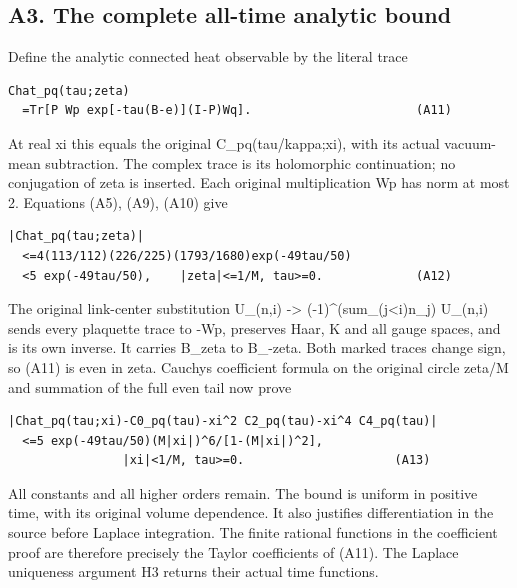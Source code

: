 \documentclass[11pt,a4paper]{article}
\renewcommand{\[}{\begingroup\small\originaldisplaystart}
\renewcommand{\]}{\originaldisplayend\endgroup}
\begin{document}
\subsection{A3. The complete all-time analytic
bound}\label{a3.-the-complete-all-time-analytic-bound}

Define the analytic connected heat observable by the literal trace

\begin{verbatim}
Chat_pq(tau;zeta)
  =Tr[P Wp exp[-tau(B-e)](I-P)Wq].                       (A11)
\end{verbatim}

At real xi this equals the original
{C\allowbreak{}\_\allowbreak{}p\allowbreak{}q\allowbreak{}(\allowbreak{}t\allowbreak{}a\allowbreak{}u\allowbreak{}/\allowbreak{}k\allowbreak{}a\allowbreak{}p\allowbreak{}p\allowbreak{}a\allowbreak{};\allowbreak{}x\allowbreak{}i\allowbreak{})\allowbreak{},\allowbreak{}}
with its actual vacuum-mean subtraction. The complex trace is its
holomorphic continuation; no conjugation of zeta is inserted. Each
original multiplication Wp has norm at most 2. Equations (A5), (A9),
(A10) give

\begin{verbatim}
|Chat_pq(tau;zeta)|
  <=4(113/112)(226/225)(1793/1680)exp(-49tau/50)
  <5 exp(-49tau/50),    |zeta|<=1/M, tau>=0.             (A12)
\end{verbatim}

The original link-center substitution U\_(n,i) -\textgreater{}
{(\allowbreak{}-\allowbreak{}1\allowbreak{})\allowbreak{}\textasciicircum{}\allowbreak{}(\allowbreak{}s\allowbreak{}u\allowbreak{}m\allowbreak{}\_\allowbreak{}(\allowbreak{}j\allowbreak{}\textless{}\allowbreak{}i\allowbreak{})\allowbreak{}n\allowbreak{}\_\allowbreak{}j\allowbreak{})\allowbreak{}}
U\_(n,i) sends every plaquette trace to -Wp, preserves Haar, K and all
gauge spaces, and is its own inverse. It carries B\_zeta to B\_-zeta.
Both marked traces change sign, so (A11) is even in zeta.
Cauchy\textquotesingle s coefficient formula on the original circle
\textbar zeta/M and summation of the full even tail now prove

\begin{verbatim}
|Chat_pq(tau;xi)-C0_pq(tau)-xi^2 C2_pq(tau)-xi^4 C4_pq(tau)|
  <=5 exp(-49tau/50)(M|xi|)^6/[1-(M|xi|)^2],
                |xi|<1/M, tau>=0.                     (A13)
\end{verbatim}

All constants and all higher orders remain. The bound is uniform in
positive time, with its original volume dependence. It also justifies
differentiation in the source before Laplace integration. The finite
rational functions in the coefficient proof are therefore precisely the
Taylor coefficients of (A11). The Laplace uniqueness argument H3 returns
their actual time functions.
\end{document}
